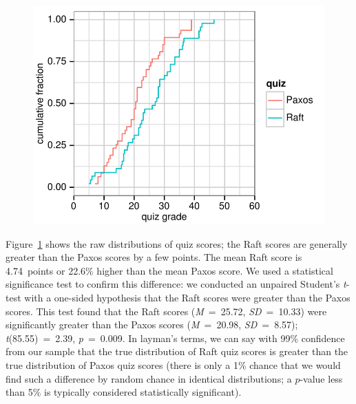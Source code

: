 \begin{figure}
\centering
{
\includegraphics{userstudy/unpairedcdf}
}
\label{fig:userstudy:unpairedcdf}
\end{figure}

Figure~\ref{fig:userstudy:unpairedcdf} shows the raw distributions of quiz scores;
the Raft scores are generally greater than the Paxos scores by
a few points.
The mean Raft score is \SI{4.74}{points} or 22.6\% higher than
the mean Paxos score.
We used a statistical significance test to confirm this difference:
we conducted an unpaired Student's \emph{t}-test with a one-sided
hypothesis that the Raft scores were greater than the Paxos scores.
This test found that
the Raft scores (\emph{M}~=~25.72, \emph{SD}~=~10.33) were significantly
greater than the Paxos scores (\emph{M}~=~20.98, \emph{SD}~=~8.57);
\emph{t}(85.55)~=~2.39, \emph{p}~=~0.009.
In layman's terms, we can say with 99\%
confidence from our sample that the true distribution of Raft quiz
scores is greater than the true distribution of Paxos quiz scores
(there is only a 1\% chance that we would find such a difference by
random chance in identical distributions; a $p$-value less than 5\%
is typically considered statistically significant).

